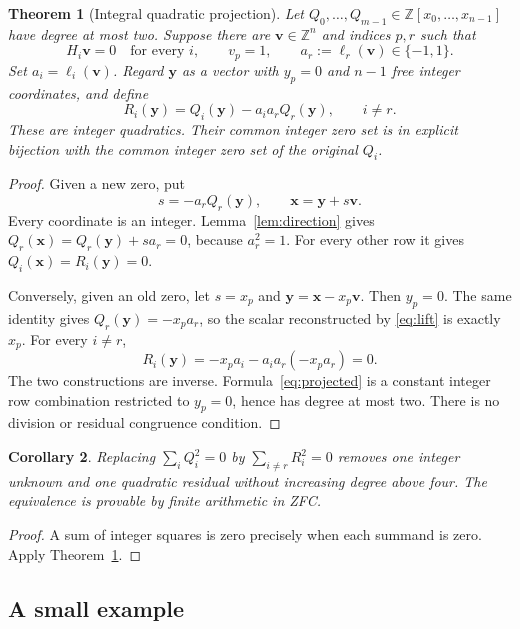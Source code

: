 \documentclass[10pt,letterpaper]{article}
\newtheorem{theorem}{Theorem}[section]
\newtheorem{corollary}[theorem]{Corollary}
\theoremstyle{definition}\newtheorem{remark}[theorem]{Remark}
\newcommand{\Z}{\mathbb Z}\newcommand{\Q}{\mathbb Q}\newcommand{\N}{\mathbb N}
\begin{document}
\begin{theorem}[Integral quadratic projection]\label{thm:projection}
Let $Q_0,\ldots,Q_{m-1}\in\Z[x_0,\ldots,x_{n-1}]$ have degree at most
two. Suppose there are $\boldsymbol v\in\Z^n$ and indices $p,r$ such that
\[
 H_i\boldsymbol v=0\quad\text{for every }i,\qquad v_p=1,\qquad
 a_r:=\ell_r(\boldsymbol v)\in\{-1,1\}.
\]
Set $a_i=\ell_i(\boldsymbol v)$. Regard $\boldsymbol y$ as a vector with
$y_p=0$ and $n-1$ free integer coordinates, and define
\begin{equation}\label{eq:projected}
 R_i(\boldsymbol y)=Q_i(\boldsymbol y)-a_i a_rQ_r(\boldsymbol y),
 \qquad i\ne r.
\end{equation}
These are integer quadratics. Their common integer zero set is in explicit
bijection with the common integer zero set of the original $Q_i$.
\end{theorem}
\begin{proof}
Given a new zero, put
\begin{equation}\label{eq:lift}
 s=-a_rQ_r(\boldsymbol y),\qquad
 \boldsymbol x=\boldsymbol y+s\boldsymbol v.
\end{equation}
Every coordinate is an integer. Lemma~\ref{lem:direction} gives
$Q_r(\boldsymbol x)=Q_r(\boldsymbol y)+sa_r=0$, because $a_r^2=1$.
For every other row it gives
$Q_i(\boldsymbol x)=R_i(\boldsymbol y)=0$.

Conversely, given an old zero, let $s=x_p$ and
$\boldsymbol y=\boldsymbol x-x_p\boldsymbol v$. Then $y_p=0$.
The same identity gives $Q_r(\boldsymbol y)=-x_pa_r$, so the scalar
reconstructed by \eqref{eq:lift} is exactly $x_p$. For every $i\ne r$,
\[
 R_i(\boldsymbol y)=-x_pa_i-a_i a_r(-x_pa_r)=0.
\]
The two constructions are inverse. Formula~\eqref{eq:projected} is a
constant integer row combination restricted to $y_p=0$, hence has degree
at most two. There is no division or residual congruence condition.
\end{proof}

\begin{corollary}
Replacing $\sum_iQ_i^2=0$ by $\sum_{i\ne r}R_i^2=0$ removes one integer
unknown and one quadratic residual without increasing degree above four.
The equivalence is provable by finite arithmetic in ZFC.
\end{corollary}
\begin{proof}
A sum of integer squares is zero precisely when each summand is zero.
Apply Theorem~\ref{thm:projection}.
\end{proof}

\subsection{A small example}
\end{document}
